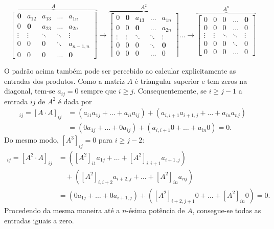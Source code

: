 \documentclass[12pt,a4paper]{article}
\begin{document}
\begin{enumerate}
\begin{enumerate}
\begin{enumerate}
\[
\overset{A}{
\overbrace{
\begin{bmatrix}
\textbf{0} &     a_{12} & a_{13} & \ldots & a_{1n} \\
         0 & \textbf{0} & a_{23} & \ldots & a_{2n} \\
    \vdots &     \vdots & \ddots & \ddots & \vdots \\
         0 &          0 &      0 & \ddots & a_{n-1,n} \\
         0 &          0 &      0 & \ldots & \textbf{0}
\end{bmatrix}
}}
\rightarrow
\overset{A^2}{
\overbrace{
\begin{bmatrix}
         0 & \textbf{0} & a_{13} & \ldots & a_{1n} \\
         0 &          0 & \textbf{0} & \ldots & a_{2n} \\
    \vdots &     \vdots &     \ddots & \ddots & \vdots \\
         0 &          0 &          0 & \ddots & \textbf{0} \\
         0 &          0 &          0 & \ldots & 0
\end{bmatrix}
}}
\ldots \rightarrow
\overset{A^n}{
\overbrace{
\begin{bmatrix}
         0 &          0 &          0 & \ldots & \textbf{0} \\
         0 &          0 &          0 & \ldots & 0 \\
    \vdots &     \vdots &     \ddots & \ddots & \vdots \\
         0 &          0 &          0 & \ddots & 0 \\
         0 &          0 &          0 & \ldots & 0
\end{bmatrix}
}}
\]

O padrão acima também pode ser percebido ao calcular explicitamente as entradas dos produtos. Como a matriz $A$ é triangular superior e tem zeros na diagonal, tem-se $a_{ij} = 0$ sempre que $i \geq j$. Consequentemente, se $i \geq j-1$ a entrada $ij$ de $A^2$ é dada por
\begin{align*}
[A^2]_{ij}
  = [A \cdot A]_{ij}
& = (a_{i1} a_{1j}       + \ldots + a_{ii} a_{ij})
  + (a_{i,i+1} a_{i+1,j} + \ldots + a_{in} a_{nj}) \\
& = (0 a_{1j}       + \ldots + 0 a_{ij})
  + (a_{i,i+1} 0 + \ldots + a_{in} 0)
  = 0.
\end{align*}
Do mesmo modo, $[A^3]_{ij} = 0$ para $i \geq j-2$:
\begin{align*}
[A^3]_{ij}
  = [A^2 \cdot A]_{ij}
& = ([A^2]_{i1} a_{1j} + \ldots + [A^2]_{i,i+1} a_{i+1,j}) \\
& \quad + ([A^2]_{i,i+2} a_{i+2,j} + \ldots + [A^2]_{in} a_{nj}) \\
& = (0 a_{1j}       + \ldots + 0 a_{i+1,j})
  + ([A^2]_{i+2,j+1} 0 + \ldots + [A^2]_{in} 0)
  = 0.
\end{align*}
Procedendo da mesma maneira até a $n$-ésima potência de $A$, consegue-se todas as entradas iguais a zero.
\end{enumerate}
\end{enumerate}



\end{enumerate}
\end{document}
